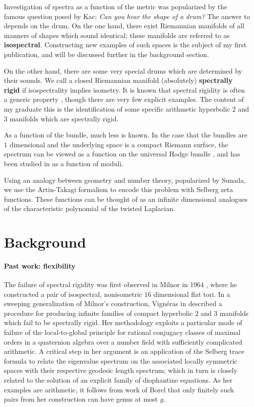 \documentclass[12pt]{article}
\begin{document}
Investigation of spectra as a function of the metric was popularized by the
famous question posed by Kac:  \emph{Can you hear the shape of a drum?}   The answer to depends on the drum. On the one hand, there exist
Riemannian manifolds of all manners of shapes which sound identical; these
manifolds are referred to as \textbf{isospectral}. Constructing  new examples of
such spaces is the subject of my first publication, and will be discussed
further in the background section.

On the other hand, there are some very special drums which are determined by
their sounds. We call a closed Riemannian manifold (absolutely)
\textbf{spectrally rigid} if isospectrality implies isometry. It is known that
spectral rigidity is often a generic property
, though there are very few
explicit examples. The content of my graduate this is the identification of some
specific arithmetic hyperbolic $2$ and $3$ manifolds which are spectrally rigid. 

As a function of the bundle, much less is known. In the case that the bundles
are $1$ dimensional and the underlying space is a compact Riemann surface, the
spectrum can be viewed as a function on the universal Hodge bundle \cite{fay1973}, and has been studied in \cite{takhtajan1991} as a function of moduli.	

Using an analogy between geometry and number theory, popularized by Sunada, we
use the Artin-Takagi formalism \cite{venkov1981} to encode this problem with Selberg zeta
functions. These functions can be thought of as an infinite dimensional
analogues of the characteristic polynomial of the twisted Laplacian. 

\section{Background}
\paragraph{Past work: flexibility} The failure of spectral rigidity was first observed in Milnor in 1964 \cite{milnor1964}, where he constructed a pair of isospectral, nonisometric $16$ dimensional flat tori. In a sweeping generalization of Milnor's construction,  Vignéras in \cite{}  described a procedure for producing infinite families of compact hyperbolic $2$ and $3$  manifolds which fail to be spectrally rigid. Her methodology  exploits  a  particular mode of failure of the local-to-global principle for rational conjugacy classes of maximal orders in a quaternion algebra over a number field with sufficiently complicated arithmetic.  A critical step in her argument is an application of the Selberg trace formula to relate the eigenvalue spectrum on the associated locally symmetric spaces with their respective geodesic length spectrum; which in turn is closely related to the solution of an explicit family of diophantine equations.  As her examples are arithmetic, it follows from work of Borel \cite{borel1989} that only finitely such pairs from her construction can have genus at most $g$.
\end{document}
